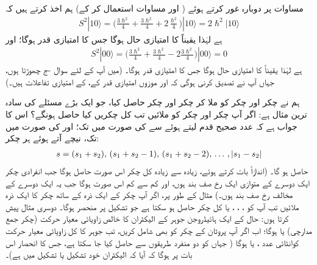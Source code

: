 مساوات  پر دوبارہ غور کرتے ہوئے ( اور مساوات  استعمال کر کے) ہم اخذ کرتے ہیں کہ 
\begin{align}\label{مساوات_تین_ابعاد_ایک_صفر_بعد_درکار}
S^2 | 1 0 \rangle = \big ( \frac{3\hslash^2}{4} + \frac{3\hslash^2}{4} +2 \frac{ \hslash^2}{4} \big ) | 1 0 \rangle =2\hslash^2 |1 0\rangle
\end{align}
ہے لہٰذا  یقیناً  کا امتیازی حال ہوگا جس کا امتیازی قدر  ہوگا؛ اور 
\begin{align}
S^2 | 0 0 \rangle = \big ( \frac{3\hslash^2}{4} + \frac{3\hslash^2}{4} -2 \frac{3 \hslash^2}{4} \big ) | 0 0 \rangle =0
\end{align}
ہے لہٰذا  یقیناً  کا امتیازی حال ہوگا جس کا امتیازی قدر  ہوگا۔ (میں آپ کے لئے سوال -ج چھوڑتا ہوں، جہاں آپ نے تصدیق کرنی ہوگی کہ  اور موزوں امتیازی قدر کے،  کے امتیازی تفاعلات ہیں۔)

 ہم نے  چکر اور  چکر کو ملا کر  چکر اور  چکر حاصل کیا، جو ایک بڑے مسئلے کی سادہ ترین مثال ہے: اگر آپ  چکر اور  چکر کو ملائیں تب کل چکریں  کیا حاصل ہونگے؟  اس کا جواب ہے کہ عدد صحیح قدم لیتے ہوئے  سے  کی صورت میں  تک؛ اور  کی صورت میں  تک، نیچے آتے ہوئے ہر چکر: 
\begin{align}
s=(s_1+s_2), \,(s_1+s_2-1),\, (s_1+s_2-2), \,\dotsc \, , \,\abs{s_1-s_2}
\end{align}
حاصل ہو گا۔ (اندازاً بات کرتے ہوئے، زیادہ سے زیادہ کل چکر اس صورت حاصل ہوگا جب انفرادی چکر ایک دوسرے کے متوازی ایک رخ صف بند ہوں، اور کم سے کم اس صورت ہوگا جب یہ ایک دوسرے کے مخالف رخ صف بند ہوں۔) مثال کے طور پر، اگر آپ  چکر کے ایک ذرہ کے ساتھ  چکر کا ایک ذرہ ملائیں تب آپ کو ، ، ، یا  کل چکر حاصل ہو سکتا ہے جو تشکیل پر منحصر ہوگا۔ دوسری مثال پیش کرتا ہوں: حال  کے ایک ہائیڈروجن جوہر کے الیکٹران کا خالص زاویائی معیار حرکت (چکر
 جمع مدارچی)  یا  ہوگا؛ اب اگر آپ پروٹان کے چکر کو بھی شامل کریں، تب جوہر کا کل زاویائی معیار حرکت کوانٹائی عدد ،  یا  ہوگا ( جہاں  کو دو منفرد طریقوں سے حاصل کیا جا سکتا ہے، جس کا انحصار اس بات پر ہوگا کہ آیا کہ الیکٹران خود  تشکیل یا  تشکیل میں ہے)۔

